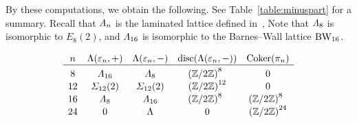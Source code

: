 \documentclass{amsart} %
\begin{document}
By these computations,
 we obtain the following.
 See Table~\ref{table:minuspart} for a summary.
 Recall that $\varLambda_{n}$ is 
 the laminated lattice defined in~\cite[Figure 6.2]{theCSbook},
 Note that $\varLambda_8$
is isomorphic to $E_8(2)$,
and $\varLambda_{16}$ is 
isomorphic to the Barnes--Wall lattice $\mathrm{BW}_{16}$.
%
\begin{table}
\[
\begin{array}{ccccc}
n & \Leech(\vep_n, +)& \Leech(\vep_n, -) & \disc(\Leech(\vep_n, -)) & \Coker (\pi_n) \\
\hline
8 & \Lamsxtn & \Laminated_{8} & {(\ZZ/2\ZZ)}^{8\;\;} & 0 \mystruth{12pt}\\
12 & \Sigmatwlv(2) & \Sigmatwlv(2) & {(\ZZ/2\ZZ)}^{12} & 0 \\
16 & \Laminated_{8} & \Lamsxtn & {(\ZZ/2\ZZ)}^{8\;\;} &{(\ZZ/2\ZZ)}^{8\;\;} \\
24& 0 & \Leech &0 &{(\ZZ/2\ZZ)}^{24} \\
\end{array}
\]
\caption{$\Leech(\vep_n, +)$ and $\Leech(\vep_n, -)$}\label{table:minuspart}
\end{table}
%
\end{document}
